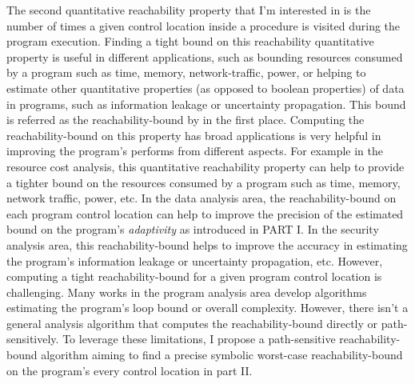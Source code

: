 

The second quantitative reachability property that I'm interested in is 
the number of times a given control location 
 inside a procedure is visited during the program execution.
Finding a tight bound on this reachability quantitative property is
useful in different applications, such as
bounding 
resources consumed by a program such as time, memory,
network-traffic, power, 
or helping to estimate other quantitative properties (as opposed to boolean properties)
of data in programs, such as information leakage or uncertainty propagation.
This bound is referred as the reachability-bound by \cite{GulwaniZ10} in the first place.
Computing the
reachability-bound on this property
has broad
applications is very helpful in improving the program's performs from different aspects.
For example in the resource cost analysis, this quantitative reachability property
can help to provide a tighter
bound on the resources consumed by a program such as time, memory,
network traffic, power, etc.
In the data analysis area,
the reachability-bound on each program control location
can help to improve the precision of the estimated bound on the program's \emph{adaptivity} as introduced in PART I.
In the security analysis area, this reachability-bound helps to improve the accuracy
in estimating the program's information leakage or uncertainty propagation, etc.
However, computing a tight reachability-bound for a given program control location is challenging.
Many works in the program analysis area develop algorithms estimating the program's loop bound or overall complexity.
However, there isn't a general analysis algorithm that
computes the reachability-bound
directly or path-sensitively.
To leverage these limitations,
I propose a path-sensitive reachability-bound algorithm
aiming to find a precise symbolic worst-case reachability-bound on the program's every control location
in part II.

